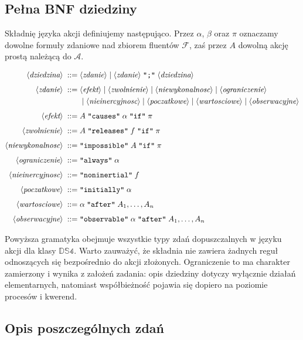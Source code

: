 \documentclass[11pt,a4paper]{article}
\newcommand{\bnfchar}[1]{\texttt{\textquotedbl#1\textquotedbl}}
\newcommand{\bnfsym}[1]{\langle \textit{#1} \rangle}
\theoremstyle{definition}
\begin{document}
\subsection{Pełna BNF dziedziny}

Składnię języka akcji definiujemy następująco. Przez $\alpha$, $\beta$ oraz $\pi$ oznaczamy dowolne formuły zdaniowe nad zbiorem fluentów $\mathcal{F}$, zaś przez $A$ dowolną akcję prostą należącą do $\mathcal{A}$.

\begin{align*}
\bnfsym{dziedzina} \;::=\;&
  \bnfsym{zdanie}
  \mid \bnfsym{zdanie} \; \bnfchar{;} \; \bnfsym{dziedzina} \\[4pt]
\bnfsym{zdanie} \;::=\;&
  \bnfsym{efekt}
  \mid \bnfsym{zwolnienie}
  \mid \bnfsym{niewykonalnosc}
  \mid \bnfsym{ograniczenie} \\
  &\mid \bnfsym{nieinercyjnosc}
  \mid \bnfsym{poczatkowe}
  \mid \bnfsym{wartosciowe}
  \mid \bnfsym{obserwacyjne} \\[4pt]
\bnfsym{efekt} \;::=\;&
  A \; \bnfchar{causes} \; \alpha \; \bnfchar{if} \; \pi \\[4pt]
\bnfsym{zwolnienie} \;::=\;&
  A \; \bnfchar{releases} \; f \; \bnfchar{if} \; \pi \\[4pt]
\bnfsym{niewykonalnosc} \;::=\;&
  \bnfchar{impossible} \; A \; \bnfchar{if} \; \pi \\[4pt]
\bnfsym{ograniczenie} \;::=\;&
  \bnfchar{always} \; \alpha \\[4pt]
\bnfsym{nieinercyjnosc} \;::=\;&
  \bnfchar{noninertial} \; f \\[4pt]
\bnfsym{poczatkowe} \;::=\;&
  \bnfchar{initially} \; \alpha \\[4pt]
\bnfsym{wartosciowe} \;::=\;&
  \alpha \; \bnfchar{after} \; A_1,\dots,A_n \\[4pt]
\bnfsym{obserwacyjne} \;::=\;&
  \bnfchar{observable} \; \alpha \; \bnfchar{after} \; A_1,\dots,A_n
\end{align*}

Powyższa gramatyka obejmuje wszystkie typy zdań dopuszczalnych w języku akcji dla klasy $\mathbb{DS4}$. Warto zauważyć, że składnia nie zawiera żadnych reguł odnoszących się bezpośrednio do akcji złożonych. Ograniczenie to ma charakter zamierzony i wynika z założeń zadania: opis dziedziny dotyczy wyłącznie działań elementarnych, natomiast współbieżność pojawia się dopiero na poziomie procesów i kwerend.

\subsection{Opis poszczególnych zdań}
\end{document}

